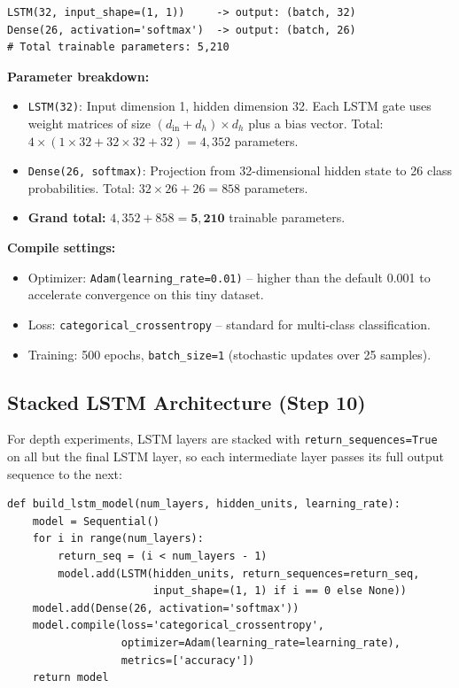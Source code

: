 \documentclass[12pt,a4paper]{article}
\begin{document}
\begin{lstlisting}[caption={Baseline LSTM architecture}]
LSTM(32, input_shape=(1, 1))     -> output: (batch, 32)
Dense(26, activation='softmax')  -> output: (batch, 26)
# Total trainable parameters: 5,210
\end{lstlisting}

\textbf{Parameter breakdown:}
\begin{itemize}
  \item \texttt{LSTM(32)}: Input dimension 1, hidden dimension 32. Each LSTM gate uses
        weight matrices of size $(d_{\text{in}} + d_h) \times d_h$ plus a bias vector.
        Total: $4 \times (1 \times 32 + 32 \times 32 + 32) = 4{,}352$ parameters.
  \item \texttt{Dense(26, softmax)}: Projection from 32-dimensional hidden state to 26
        class probabilities. Total: $32 \times 26 + 26 = 858$ parameters.
  \item \textbf{Grand total:} $4{,}352 + 858 = \mathbf{5{,}210}$ trainable parameters.
\end{itemize}

\textbf{Compile settings:}
\begin{itemize}
  \item Optimizer: \texttt{Adam(learning\_rate=0.01)} -- higher than the default 0.001
        to accelerate convergence on this tiny dataset.
  \item Loss: \texttt{categorical\_crossentropy} -- standard for multi-class classification.
  \item Training: 500 epochs, \texttt{batch\_size=1} (stochastic updates over 25 samples).
\end{itemize}

\subsection{Stacked LSTM Architecture (Step 10)}

For depth experiments, LSTM layers are stacked with \texttt{return\_sequences=True} on all
but the final LSTM layer, so each intermediate layer passes its full output sequence to
the next:

\begin{lstlisting}[caption={Stacked LSTM builder (depth-variable)}]
def build_lstm_model(num_layers, hidden_units, learning_rate):
    model = Sequential()
    for i in range(num_layers):
        return_seq = (i < num_layers - 1)
        model.add(LSTM(hidden_units, return_sequences=return_seq,
                       input_shape=(1, 1) if i == 0 else None))
    model.add(Dense(26, activation='softmax'))
    model.compile(loss='categorical_crossentropy',
                  optimizer=Adam(learning_rate=learning_rate),
                  metrics=['accuracy'])
    return model
\end{lstlisting}
\end{document}
